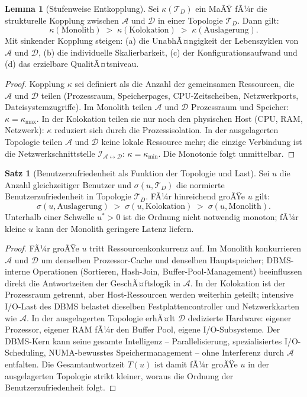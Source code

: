 ﻿\documentclass[a4paper,12pt]{article}
\theoremstyle{definition}
\newtheorem{satz}{Satz}
\newtheorem{lemma}{Lemma}
\begin{document}
\begin{lemma}[Stufenweise Entkopplung]
\label{lem:entkopplung}
Sei $\kappa(\mathcal{T}_D)$ ein MaÃŸ fÃ¼r die strukturelle Kopplung zwischen $\mathcal{A}$ und $\mathcal{D}$ in einer Topologie $\mathcal{T}_D$. Dann gilt:
\[
\kappa(\text{Monolith}) \;>\; \kappa(\text{Kolokation}) \;>\; \kappa(\text{Auslagerung}).
\]
Mit sinkender Kopplung steigen: (a) die UnabhÃ¤ngigkeit der Lebenszyklen von $\mathcal{A}$ und $\mathcal{D}$, (b) die individuelle Skalierbarkeit, (c) der Konfigurationsaufwand und (d) das erzielbare QualitÃ¤tsniveau.
\end{lemma}

\begin{proof}
Kopplung $\kappa$ sei definiert als die Anzahl der gemeinsamen Ressourcen, die $\mathcal{A}$ und $\mathcal{D}$ teilen (Prozessraum, Speicherpages, CPU-Zeitscheiben, Netzwerkports, Dateisystemzugriffe). Im Monolith teilen $\mathcal{A}$ und $\mathcal{D}$ Prozessraum und Speicher: $\kappa = \kappa_\text{max}$. In der Kolokation teilen sie nur noch den physischen Host (CPU, RAM, Netzwerk): $\kappa$ reduziert sich durch die Prozessisolation. In der ausgelagerten Topologie teilen $\mathcal{A}$ und $\mathcal{D}$ keine lokale Ressource mehr; die einzige Verbindung ist die Netzwerkschnittstelle $\mathcal{I}_{\mathcal{A} \leftrightarrow \mathcal{D}}$: $\kappa = \kappa_\text{min}$. Die Monotonie folgt unmittelbar.
\end{proof}

\begin{satz}[Benutzerzufriedenheit als Funktion der Topologie und Last]
\label{satz:zufriedenheit}
Sei $u$ die Anzahl gleichzeitiger Benutzer und $\sigma(u, \mathcal{T}_D)$ die normierte Benutzerzufriedenheit in Topologie $\mathcal{T}_D$. FÃ¼r hinreichend groÃŸe $u$ gilt:
\[
\sigma(u, \text{Auslagerung}) \;>\; \sigma(u, \text{Kolokation}) \;>\; \sigma(u, \text{Monolith}).
\]
Unterhalb einer Schwelle $u^* > 0$ ist die Ordnung nicht notwendig monoton; fÃ¼r kleine $u$ kann der Monolith geringere Latenz liefern.
\end{satz}

\begin{proof}
FÃ¼r groÃŸe $u$ tritt Ressourcenkonkurrenz auf. Im Monolith konkurrieren $\mathcal{A}$ und $\mathcal{D}$ um denselben Prozessor-Cache und denselben Hauptspeicher; DBMS-interne Operationen (Sortieren, Hash-Join, Buffer-Pool-Management) beeinflussen direkt die Antwortzeiten der GeschÃ¤ftslogik in $\mathcal{A}$. In der Kolokation ist der Prozessraum getrennt, aber Host-Ressourcen werden weiterhin geteilt; intensive I/O-Last des DBMS belastet dieselben Festplattencontroller und Netzwerkkarten wie $\mathcal{A}$. In der ausgelagerten Topologie erhÃ¤lt $\mathcal{D}$ dedizierte Hardware: eigener Prozessor, eigener RAM fÃ¼r den Buffer Pool, eigene I/O-Subsysteme. Der DBMS-Kern kann seine gesamte Intelligenz -- Parallelisierung, spezialisiertes I/O-Scheduling, NUMA-bewusstes Speichermanagement -- ohne Interferenz durch $\mathcal{A}$ entfalten. Die Gesamtantwortzeit $T(u)$ ist damit fÃ¼r groÃŸe $u$ in der ausgelagerten Topologie strikt kleiner, woraus die Ordnung der Benutzerzufriedenheit folgt.
\end{proof}
\end{document}
